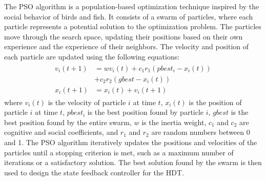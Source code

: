 The PSO algorithm is a population-based optimization technique inspired by the social behavior of birds and fish. It consists of a swarm of particles, where each particle represents a potential solution to the optimization problem. The particles move through the search space, updating their positions based on their own experience and the experience of their neighbors. The velocity and position of each particle are updated using the following equations:
\begin{align}
    \begin{aligned}
        v_i(t+1) &= w v_i(t) + c_1 r_1 (pbest_i - x_i(t))\\
        &+ c_2 r_2 (gbest - x_i(t)) \\
        x_i(t+1) &= x_i(t) + v_i(t+1)
    \end{aligned}
\end{align}
where $v_i(t)$ is the velocity of particle $i$ at time $t$, $x_i(t)$ is the position of particle $i$ at time $t$, $pbest_i$ is the best position found by particle $i$, $gbest$ is the best position found by the entire swarm, $w$ is the inertia weight, $c_1$ and $c_2$ are cognitive and social coefficients, and $r_1$ and $r_2$ are random numbers between 0 and 1.
The PSO algorithm iteratively updates the positions and velocities of the particles until a stopping criterion is met, such as a maximum number of iterations or a satisfactory solution. The best solution found by the swarm is then used to design the state feedback controller for the HDT.